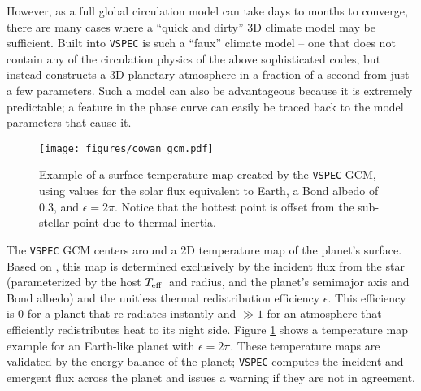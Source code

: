 \documentclass[linenumbers,5p,twocolumn,authoryear]{elsarticle}
\newcommand{\teff}{$T_{\rm eff}$}
\newcommand{\vspec}[1]{\texttt{VSPEC}#1}
\begin{document}
However, as a full global circulation model can take days to months to converge, there are many cases where a ``quick and dirty'' 3D climate model may be sufficient. Built into \vspec{} is such a ``faux'' climate model -- one that does not contain any of the circulation physics of the above sophisticated codes, but instead constructs a 3D planetary atmosphere in a fraction of a second from just a few parameters. Such a model can also be advantageous because it is extremely predictable; a feature in the phase curve can easily be traced back to the model parameters that cause it.

\begin{figure}
    \centering
    \texttt{[image: figures/cowan\_gcm.pdf]}
    \caption{
        Example of a surface temperature map created by the \vspec{} GCM, using values for the solar flux equivalent to Earth, a Bond albedo of 0.3, and $\epsilon = 2\pi$. Notice that the hottest point is offset from the sub-stellar point due to thermal inertia.
    }
    \label{fig:thermal_inertia}
\end{figure}

The \vspec{} GCM centers around a 2D temperature map of the planet's surface. Based on \citet{cowan2011}, this map
is determined exclusively by the incident flux from the star (parameterized by the host \teff~and radius,
and the planet's semimajor axis and Bond albedo) and the unitless thermal redistribution efficiency $\epsilon$.
This efficiency is 0 for a planet that re-radiates instantly and $\gg 1$ for an atmosphere that efficiently redistributes heat to its night side. Figure \ref{fig:thermal_inertia} shows a temperature map example for an Earth-like planet with $\epsilon = 2\pi$. These temperature maps are validated by the energy balance of the planet; \vspec{} computes the incident and emergent flux across the planet and issues a warning if they are not in agreement.
\end{document}
